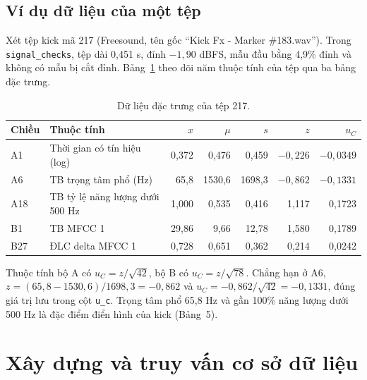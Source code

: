\documentclass[11pt,a4paper]{article}
\begin{document}
\subsection{Ví dụ dữ liệu của một tệp}
Xét tệp kick mã 217 (Freesound, tên gốc ``Kick Fx - Marker \#183.wav''). Trong \texttt{signal\_checks}, tệp dài 0,451 s, đỉnh $-1{,}90$ dBFS, mẫu đầu bằng 4,9\% đỉnh và không có mẫu bị cắt đỉnh. Bảng~\ref{tab:vidu217} theo dõi năm thuộc tính của tệp qua ba bảng đặc trưng.
\begin{table}[htbp]
\centering\small
\caption{Dữ liệu đặc trưng của tệp 217.}\label{tab:vidu217}
\begin{tabular}{llrrrrr}
\toprule
Chiều & Thuộc tính & $x$ & $\mu$ & $s$ & $z$ & $u_C$\\\midrule
A1 & Thời gian có tín hiệu (log) & 0,372 & 0,476 & 0,459 & $-0{,}226$ & $-0{,}0349$\\
A6 & TB trọng tâm phổ (Hz) & 65,8 & 1530,6 & 1698,3 & $-0{,}862$ & $-0{,}1331$\\
A18 & TB tỷ lệ năng lượng dưới 500 Hz & 1,000 & 0,535 & 0,416 & 1,117 & 0,1723\\
B1 & TB MFCC 1 & 29,86 & 9,66 & 12,78 & 1,580 & 0,1789\\
B27 & ĐLC delta MFCC 1 & 0,728 & 0,651 & 0,362 & 0,214 & 0,0242\\\bottomrule
\end{tabular}
\end{table}
Thuộc tính bộ A có $u_C=z/\sqrt{42}$, bộ B có $u_C=z/\sqrt{78}$. Chẳng hạn ở A6, $z=(65{,}8-1530{,}6)/1698{,}3=-0{,}862$ và $u_C=-0{,}862/\sqrt{42}=-0{,}1331$, đúng giá trị lưu trong cột \texttt{u\_c}. Trọng tâm phổ 65,8 Hz và gần 100\% năng lượng dưới 500 Hz là đặc điểm điển hình của kick (Bảng~5).

\section{Xây dựng và truy vấn cơ sở dữ liệu}\label{sec:xaydung}
\end{document}
